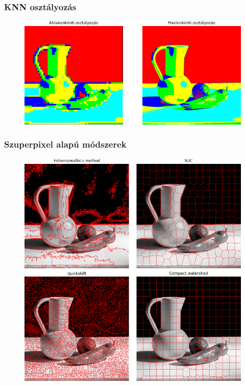 \documentclass{beamer}
\begin{document}
\begin{frame}[fragile]
\frametitle{KNN osztályozás}
\begin{figure}[!tbp]
  \centering
  \begin{minipage}[b]{1\textwidth}
      \includegraphics[width=\textwidth]{images/window_pixel_segmentation.png}
  \end{minipage}
\end{figure}
\end{frame}

\begin{frame}[fragile]
\frametitle{Szuperpixel alapú módszerek}

\begin{figure}[!tbp]
  \centering
  \begin{minipage}[b]{0.65\textwidth}
    \includegraphics[width=\textwidth]{images/superpixel_example.png}
  \end{minipage}
\end{figure}

\end{frame}
\end{document}
